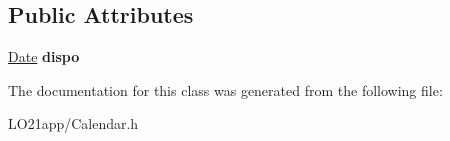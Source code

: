 \subsection*{Public Attributes}
\begin{DoxyCompactItemize}
\item 
\hypertarget{class_truc_ab9df6defd6396fa46d998df1556645b6}{}\hyperlink{class_t_i_m_e_1_1_date}{Date} {\bfseries dispo}\label{class_truc_ab9df6defd6396fa46d998df1556645b6}

\end{DoxyCompactItemize}


The documentation for this class was generated from the following file\+:\begin{DoxyCompactItemize}
\item 
L\+O21app/Calendar.\+h\end{DoxyCompactItemize}
